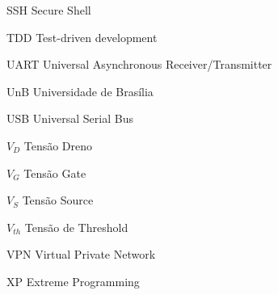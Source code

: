 \begin{siglas}
	\item [SSH]     Secure Shell
	\item [TDD]     Test-driven development
	\item [UART]    Universal Asynchronous Receiver/Transmitter
	\item [UnB]     Universidade de Brasília
	\item [USB]     Universal Serial Bus
	\item [$V_D$]   Tensão Dreno
	\item [$V_G$]   Tensão Gate
	\item [$V_S$]   Tensão Source
	\item [$V_{th}$]Tensão de Threshold
	\item [VPN]     Virtual Private Network
	\item [XP]      Extreme Programming
\end{siglas}
